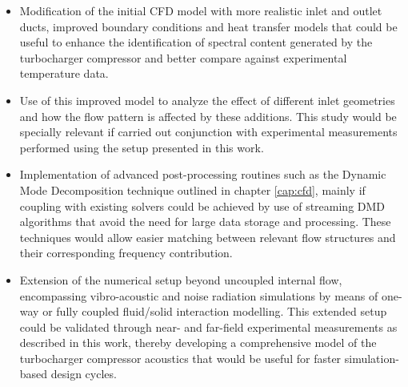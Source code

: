 \begin{itemize}
	\item Modification of the initial CFD model with more realistic inlet and outlet ducts, improved boundary conditions and heat transfer models that could be useful to enhance the identification of spectral content generated by the turbocharger compressor and better compare against experimental temperature data.

	\item Use of this improved model to analyze the effect of different inlet geometries and how the flow pattern is affected by these additions. This study would be specially relevant if carried out conjunction with experimental measurements performed using the setup presented in this work.

	\item Implementation of advanced post-processing routines such as the Dynamic Mode Decomposition technique outlined in chapter \ref{cap:cfd}, mainly if coupling with existing solvers could be achieved by use of streaming DMD algorithms that avoid the need for large data storage and processing. These techniques would allow easier matching between relevant flow structures and their corresponding frequency contribution.

	\item Extension of the numerical setup beyond uncoupled internal flow, encompassing vibro-acoustic and noise radiation simulations by means of one-way or fully coupled fluid/solid interaction modelling. This extended setup could be validated through near- and far-field experimental measurements as described in this work, thereby developing a comprehensive model of the turbocharger compressor acoustics that would be useful for faster simulation-based design cycles.
\end{itemize}